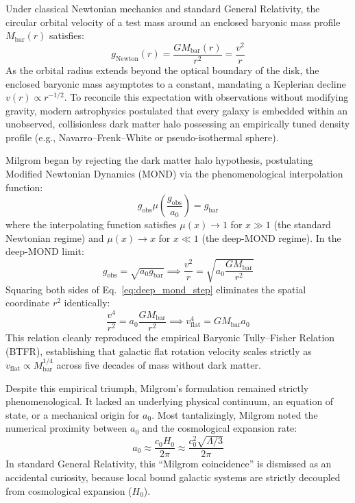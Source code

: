 \documentclass[11pt,a4paper]{article}
\begin{document}
Under classical Newtonian mechanics and standard General Relativity, the circular orbital velocity of a test mass around an enclosed baryonic mass profile $M_{\text{bar}}(r)$ satisfies:
\begin{equation}
g_{\text{Newton}}(r) = \frac{G M_{\text{bar}}(r)}{r^2} = \frac{v^2}{r}
\label{eq:newton_kepler_falloff}
\end{equation}
As the orbital radius extends beyond the optical boundary of the disk, the enclosed baryonic mass asymptotes to a constant, mandating a Keplerian decline $v(r) \propto r^{-1/2}$. To reconcile this expectation with observations without modifying gravity, modern astrophysics postulated that every galaxy is embedded within an unobserved, collisionless dark matter halo possessing an empirically tuned density profile (e.g., Navarro--Frenk--White or pseudo-isothermal sphere).

Milgrom began by rejecting the dark matter halo hypothesis, postulating Modified Newtonian Dynamics (MOND) via the phenomenological interpolation function:
\begin{equation}
g_{\text{obs}} \mu\left(\frac{g_{\text{obs}}}{a_0}\right) = g_{\text{bar}}
\label{eq:mond_interpolation}
\end{equation}
where the interpolating function satisfies $\mu(x) \to 1$ for $x \gg 1$ (the standard Newtonian regime) and $\mu(x) \to x$ for $x \ll 1$ (the deep-MOND regime). In the deep-MOND limit:
\begin{equation}
g_{\text{obs}} = \sqrt{a_0 g_{\text{bar}}} \implies \frac{v^2}{r} = \sqrt{a_0 \frac{G M_{\text{bar}}}{r^2}}
\label{eq:deep_mond_step}
\end{equation}
Squaring both sides of Eq.~\eqref{eq:deep_mond_step} eliminates the spatial coordinate $r^2$ identically:
\begin{equation}
\frac{v^4}{r^2} = a_0 \frac{G M_{\text{bar}}}{r^2} \implies v_{\text{flat}}^4 = G M_{\text{bar}} a_0
\label{eq:btfr_milgrom}
\end{equation}
This relation cleanly reproduced the empirical Baryonic Tully--Fisher Relation (BTFR), establishing that galactic flat rotation velocity scales strictly as $v_{\text{flat}} \propto M_{\text{bar}}^{1/4}$ across five decades of mass without dark matter.

Despite this empirical triumph, Milgrom's formulation remained strictly phenomenological. It lacked an underlying physical continuum, an equation of state, or a mechanical origin for $a_0$. Most tantalizingly, Milgrom noted the numerical proximity between $a_0$ and the cosmological expansion rate:
\begin{equation}
a_0 \approx \frac{c_0 H_0}{2\pi} \approx \frac{c_0^2 \sqrt{\Lambda/3}}{2\pi}
\label{eq:milgrom_coincidence}
\end{equation}
In standard General Relativity, this ``Milgrom coincidence'' is dismissed as an accidental curiosity, because local bound galactic systems are strictly decoupled from cosmological expansion ($H_0$).
\end{document}
